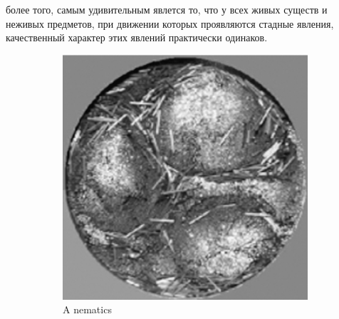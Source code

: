 	более того, самым удивительным явлется то, что у всех живых существ и неживых предметов, при движении которых проявляются стадные явления, качественный характер этих явлений практически одинаков. %
	\begin{figure}
        \centering
        \begin{subfigure}{.4\columnwidth}
                \includegraphics[width=\columnwidth]{Images/Fig4_CollectiveMotion.png}
                \caption{A nematics}
                \label{fig:CollMot:nematics}
        \end{subfigure}%
        ~ %
        \begin{subfigure}{.4\columnwidth}

\end{subfigure}
\end{figure}
